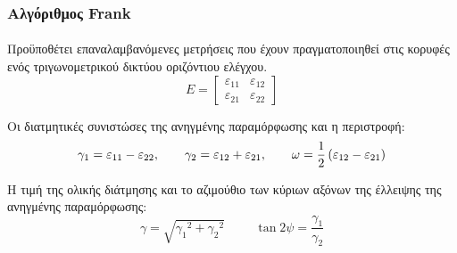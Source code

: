 \begin{frame}
  \frametitle{Αλγόριθμος Frank}
  \framesubtitle{}
  \label{fr3:frank}
  Προϋποθέτει επαναλαμβανόμενες μετρήσεις που έχουν πραγματοποιηθεί στις κορυφές ενός τριγωνομετρικού δικτύου οριζόντιου ελέγχου.
  \begin{equation*}
  \label{eq:velgrad22}
    E=\begin{bmatrix}
    \varepsilon_{11} & \varepsilon_{12}\\ 
    \varepsilon_{21} & \varepsilon_{22}
    \end{bmatrix}
  \end{equation*}
  
  Οι διατμητικές συνιστώσες της ανηγμένης παραμόρφωσης και η περιστροφή:\\
  \[    \gamma _1=\varepsilon_{11} - \varepsilon_{22}, 
  \hspace{.7cm}
      \gamma _2=\varepsilon_{12} + \varepsilon_{21}, 
  \hspace{.7cm}
      \omega = \frac{1}{2} \left (\varepsilon_{12} - \varepsilon_{21}  \right )\]
  
  Η τιμή της ολικής διάτμησης και το αζιμούθιο των κύριων αξόνων της έλλειψης της ανηγμένης παραμόρφωσης:
  \[ \gamma = \sqrt{{\gamma_{1}}^{2}+{\gamma_{2}}^{2}}
  \hspace{1cm}
  \tan 2\psi = \frac{\gamma_1}{\gamma_2} \]


\end{frame}
\note{}

